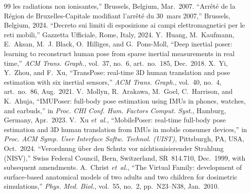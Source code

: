 \documentclass[journal,twocolumn,10pt]{IEEEtran}
\theoremstyle{plain}
\theoremstyle{definition}
\theoremstyle{remark}
\begin{document}
\begin{thebibliography}{99}
les radiations non ionisantes,'' Brussels, Belgium, Mar.~2007.
 ``Arr\^et\'e de la R\'egion de
Bruxelles-Capitale modifiant l'arr\^et\'e du 30~mars 2007,''
Brussels, Belgium, 2024.
 ``Decreto sui limiti di esposizione ai campi
elettromagnetici per le reti mobili,'' Gazzetta Ufficiale, Rome,
Italy, 2024.
 Y.~Huang, M.~Kaufmann, E.~Aksan, M.~J. Black,
O.~Hilliges, and G.~Pons-Moll, ``Deep inertial poser: learning to
reconstruct human pose from sparse inertial measurements in real
time,'' \emph{ACM Trans. Graph.}, vol.~37, no.~6, art.~no.~185,
Dec.~2018.
 X.~Yi, Y.~Zhou, and F.~Xu, ``TransPose:
real-time 3D human translation and pose estimation with six
inertial sensors,'' \emph{ACM Trans. Graph.}, vol.~40, no.~4,
art.~no.~86, Aug.~2021.
 V.~Mollyn, R.~Arakawa, M.~Goel,
C.~Harrison, and K.~Ahuja, ``IMUPoser: full-body pose estimation
using IMUs in phones, watches, and earbuds,'' in \emph{Proc. CHI
Conf. Hum. Factors Comput. Syst.}, Hamburg, Germany, Apr.~2023.
 V.~Xu \emph{et~al.}, ``MobilePoser:
real-time full-body pose estimation and 3D human translation
from IMUs in mobile consumer devices,'' in \emph{Proc. ACM Symp.
User Interface Softw. Technol. (UIST)}, Pittsburgh, PA, USA,
Oct.~2024.
 ``Verordnung \"uber den Schutz vor
nichtionisierender Strahlung (NISV),'' Swiss Federal Council,
Bern, Switzerland, SR~814.710, Dec.~1999, with subsequent
amendments.
 A.~Christ \emph{et~al.}, ``The Virtual
Family: development of surface-based anatomical models of two
adults and two children for dosimetric simulations,'' \emph{Phys.
Med. Biol.}, vol.~55, no.~2, pp.~N23--N38, Jan.~2010.
\end{thebibliography}
\end{document}
